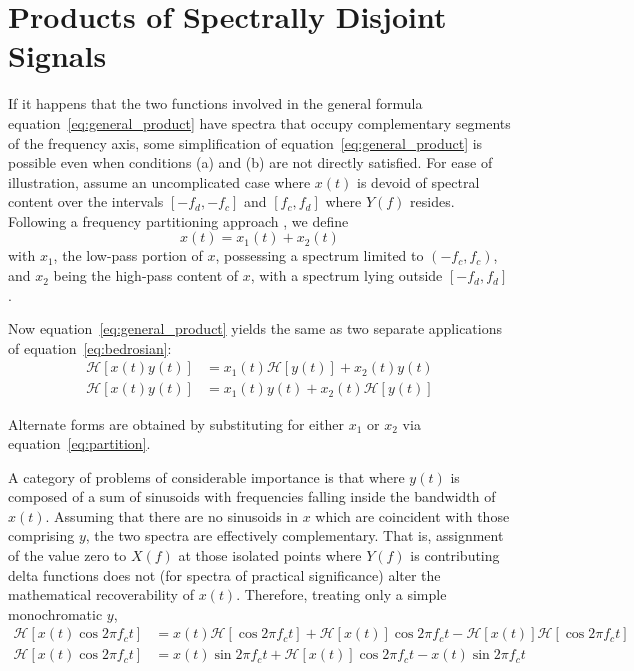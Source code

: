 \documentclass[12pt]{article}
\begin{document}
\section{Products of Spectrally Disjoint Signals}

If it happens that the two functions involved in the general formula equation~\eqref{eq:general_product} have spectra that occupy complementary segments of the frequency axis, some simplification of equation~\eqref{eq:general_product} is possible even when conditions (a) and (b) are not directly satisfied. For ease of illustration, assume an uncomplicated case where $x(t)$ is devoid of spectral content over the intervals $[-f_d, -f_c]$ and $[f_c, f_d]$ where $Y(f)$ resides. Following a frequency partitioning approach \cite{Haber1972}, we define
\begin{equation}
x(t) = x_1(t) + x_2(t)
\label{eq:partition}
\end{equation}
with $x_1$, the low-pass portion of $x$, possessing a spectrum limited to $(-f_c, f_c)$, and $x_2$ being the high-pass content of $x$, with a spectrum lying outside $[-f_d, f_d]$.

Now equation~\eqref{eq:general_product} yields the same as two separate applications of equation~\eqref{eq:bedrosian}:
\begin{align}
\mathcal{H}[x(t) y(t)] &= x_1(t) \mathcal{H}[y(t)] + x_2(t) y(t)
\label{eq:spectral1} \\
\mathcal{H}[x(t) y(t)] &= x_1(t) y(t) + x_2(t) \mathcal{H}[y(t)]
\label{eq:spectral2}
\end{align}

Alternate forms are obtained by substituting for either $x_1$ or $x_2$ via equation~\eqref{eq:partition}.

A category of problems of considerable importance is that where $y(t)$ is composed of a sum of sinusoids with frequencies falling inside the bandwidth of $x(t)$. Assuming that there are no sinusoids in $x$ which are coincident with those comprising $y$, the two spectra are effectively complementary. That is, assignment of the value zero to $X(f)$ at those isolated points where $Y(f)$ is contributing delta functions does not (for spectra of practical significance) alter the mathematical recoverability of $x(t)$. Therefore, treating only a simple monochromatic $y$,
\begin{align}
\mathcal{H}[x(t) \cos 2\pi f_c t] &= x(t) \mathcal{H}[\cos 2\pi f_c t] + \mathcal{H}[x(t)] \cos 2\pi f_c t - \mathcal{H}[x(t)] \mathcal{H}[\cos 2\pi f_c t] \label{eq:cosine_product1} \\
\mathcal{H}[x(t) \cos 2\pi f_c t] &= x(t) \sin 2\pi f_c t + \mathcal{H}[x(t)] \cos 2\pi f_c t - x(t) \sin 2\pi f_c t \label{eq:cosine_product2}
\end{align}
\end{document}
